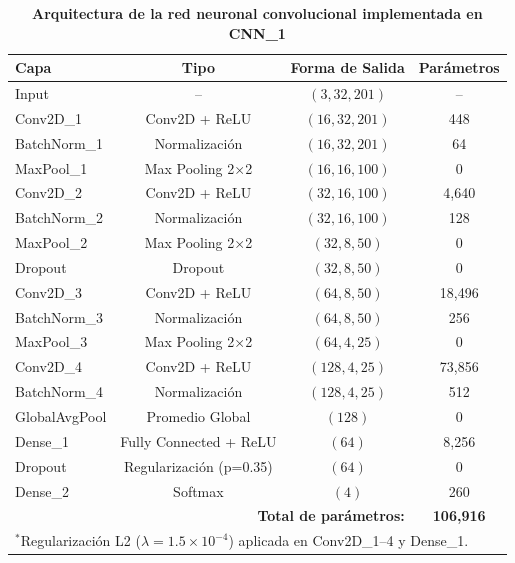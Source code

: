 \documentclass[12pt]{report}
\begin{document}
\begin{table}[htbp]
\centering
\caption{\textbf{Arquitectura de la red neuronal convolucional implementada en CNN\_1}}
\label{tab:cnn1_architecture}
\begin{tabular}{|l|c|c|c|}
\hline
\textbf{Capa} & \textbf{Tipo} & \textbf{Forma de Salida} & \textbf{Parámetros} \\
\hline
Input & -- & $(3, 32, 201)$ & -- \\
\hline
Conv2D\_1 & Conv2D + ReLU & $(16, 32, 201)$ & 448 \\
BatchNorm\_1 & Normalización & $(16, 32, 201)$ & 64 \\
MaxPool\_1 & Max Pooling 2×2 & $(16, 16, 100)$ & 0 \\
\hline
Conv2D\_2 & Conv2D + ReLU & $(32, 16, 100)$ & 4,640 \\
BatchNorm\_2 & Normalización & $(32, 16, 100)$ & 128 \\
MaxPool\_2 & Max Pooling 2×2 & $(32, 8, 50)$ & 0 \\
\hline
Dropout & Dropout & $(32, 8, 50)$ & 0 \\
\hline
Conv2D\_3 & Conv2D + ReLU & $(64, 8, 50)$ & 18,496 \\
BatchNorm\_3 & Normalización & $(64, 8, 50)$ & 256 \\
MaxPool\_3 & Max Pooling 2×2 & $(64, 4, 25)$ & 0 \\
\hline
Conv2D\_4 & Conv2D + ReLU & $(128, 4, 25)$ & 73,856 \\
BatchNorm\_4 & Normalización & $(128, 4, 25)$ & 512 \\
GlobalAvgPool & Promedio Global & $(128)$ & 0 \\
\hline
Dense\_1 & Fully Connected + ReLU & $(64)$ & 8,256 \\
Dropout & Regularización (p=0.35) & $(64)$ & 0 \\
Dense\_2 & Softmax & $(4)$ & 260 \\
\hline
\multicolumn{3}{|r|}{\textbf{Total de parámetros:}} & \textbf{106,916} \\
\hline
\multicolumn{4}{|l|}{\footnotesize{$^*$Regularización L2 ($\lambda = 1.5\times10^{-4}$) aplicada en Conv2D\_1–4 y Dense\_1.}} \\
\hline
\end{tabular}
\end{table}
\end{document}
